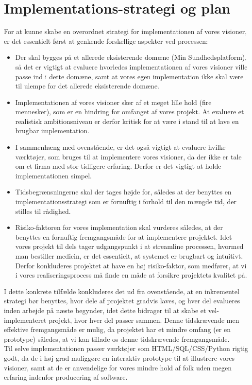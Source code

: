\section{Implementations-strategi og plan}
For at kunne skabe en overordnet strategi for implementationen af vores visioner, er det essentielt først at genkende forskellige aspekter ved processen:
\begin{itemize}
  \item Der skal bygges på et allerede eksisterende domæne (Min Sundhedsplatform), så det er vigtigt at evaluere hvorledes implementationen af vores visioner ville passe ind
    i dette domæne, samt at vores egen implementation ikke skal være til ulempe for det allerede eksisterende domæne. 
  \item Implementationen af vores visioner sker af et meget lille hold (fire mennesker), som er en hindring for omfanget af vores projekt. At evaluere et realistisk ambitionsniveau er derfor kritisk for at være i stand til at lave en brugbar implementation. 
  \item I sammenhæng med ovenstående, er det også vigtigt at evaluere hvilke værktøjer, som bruges til at implementere vores visioner, da der ikke er tale om et firma med stor tidligere erfaring. Derfor er det vigtigt at holde implementationen simpel.
  \item Tidsbegrænsningerne skal der tages højde for, således at der benyttes en implementationsstrategi som er fornuftig i forhold til den mængde tid, der stilles til rådighed.
  \item Risiko-faktoren for vores implementation skal vurderes således, at der benyttes en fornuftig fremgangsmåde for at implementere projektet. Idet vores projekt til dels tager udgangspunkt i at streamline processen, hvormed man bestiller medicin, er det essentielt, at systemet er brugbart og intuitivt. Derfor konkluderes projektet at have en høj risiko-faktor, som medfører, at vi i vores realiseringsprocess må finde en måde at forsikre projektets kvalitet på.
\end{itemize}

I dette konkrete tilfælde konkluderes det ud fra ovenstående, at en inkrementel strategi bør benyttes, hvor dele af projektet gradvis laves, og hver del evalueres inden arbejde på næste begynder, idet dette bidrager til at skabe et vel-implementeret projekt, hvor hver del passer sammen. Denne tidskrævende men effektive fremgangsmåde er mulig, da projektet har et mindre omfang (er en prototype) således, at vi kan tillade os denne tidskrævende fremgangsmåde.\\
Til selve implementationen passer værktøjer som HTML/SQL/CSS/Python rigtig godt, da de i høj grad muliggøre en interaktiv prototype til at illustrere vores visioner, samt at de er anvendelige for vores mindre hold af folk uden megen erfaring indenfor producering af software.


